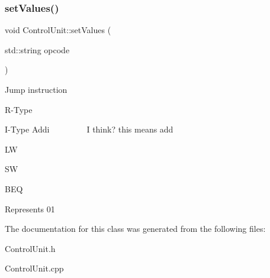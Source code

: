 \subsubsection{\texorpdfstring{set\+Values()}{setValues()}}
{\footnotesize\ttfamily void Control\+Unit\+::set\+Values (\begin{DoxyParamCaption}\item[{std\+::string}]{opcode }\end{DoxyParamCaption})}

Jump instruction

R-\/\+Type

I-\/\+Type Addi ~\newline
~\newline
~\newline
~\newline
~\newline
 I think? this means add

LW

SW

B\+EQ

Represents 01 

The documentation for this class was generated from the following files\+:\begin{DoxyCompactItemize}
\item 
Control\+Unit.\+h\item 
Control\+Unit.\+cpp\end{DoxyCompactItemize}
